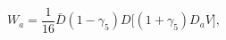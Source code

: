 \begin{equation}
W_a = \frac{1}{16} \bar D (1-\gamma_5) D\Big[(1+\gamma_5)D_a V\Big],
\end{equation}

